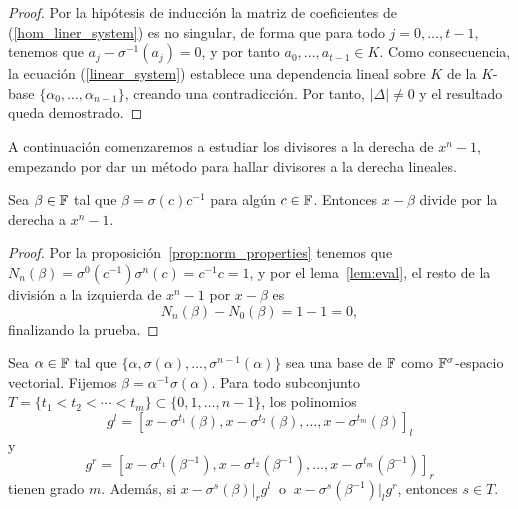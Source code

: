\begin{proof}
Por la hipótesis de inducción la matriz de coeficientes de (\ref{hom_liner_system}) es no singular, de forma que para todo \(j = 0, \dots, t-1\), tenemos que \(a_j - \sigma^{-1}(a_j) = 0\), y por tanto \(a_0, \dots, a_{t-1} \in K\). Como consecuencia, la ecuación (\ref{linear_system}) establece una dependencia lineal sobre  \(K\) de la  \(K\)-base  \(\{\alpha_0, \dots, \alpha_{n-1}\}\), creando una contradicción. Por tanto, \(|\Delta| \neq 0\) y el resultado queda demostrado.
\end{proof}

A continuación comenzaremos a estudiar los divisores a la derecha de \(x^{n} -1\), empezando por dar un método para hallar divisores a la derecha lineales.

\begin{proposition}
\label{prop:linear_div}
    Sea \(\beta \in \mathbb{F}\) tal que \(\beta = \sigma(c)c^{-1}\) para algún \(c \in \mathbb{F}\). Entonces \(x - \beta\) divide por la derecha a \(x^{n}-1\).
\end{proposition}
\begin{proof}
Por la proposición~\ref{prop:norm_properties} tenemos que \(N_n(\beta) = \sigma^{0}(c^{-1})\sigma^{n}(c) = c^{-1}c = 1\), y por el lema~\ref{lem:eval}, el resto de la división a la izquierda de \(x^{n} - 1\) por \(x - \beta\) es
    \[
    N_n(\beta) - N_0(\beta) = 1 - 1 = 0
    ,\]
finalizando la prueba.
\end{proof}

\begin{lemma}
\label{lem:deg_lcm}
    Sea \(\alpha \in \mathbb{F}\) tal que \(\{\alpha, \sigma(\alpha), \dots, \sigma^{n-1}(\alpha)\}\) sea una base de \(\mathbb{F}\) como  \(\mathbb{F}^\sigma\)-espacio vectorial. Fijemos  \(\beta = \alpha^{-1}\sigma(\alpha)\). Para todo subconjunto \(T = \{t_1 < t_2 < \cdots < t_m\} \subset \{0, 1, \dots, n-1\}\), los polinomios
    \[
    g^l = [x - \sigma^{t_1}(\beta), x - \sigma^{t_2}(\beta), \dots, x - \sigma^{t_m}(\beta)]_l
    \]
y
    \[
    g^r = [x - \sigma^{t_1}(\beta^{-1}), x - \sigma^{t_2}(\beta^{-1}), \dots, x - \sigma^{t_m}(\beta^{-1})]_r
    \]
tienen grado \(m\). Además, si \(x - \sigma^s(\beta) |_r g^l\ \) o \(\ x - \sigma^s(\beta^{-1}) |_l g^r\), entonces \(s \in T\).
\end{lemma}

